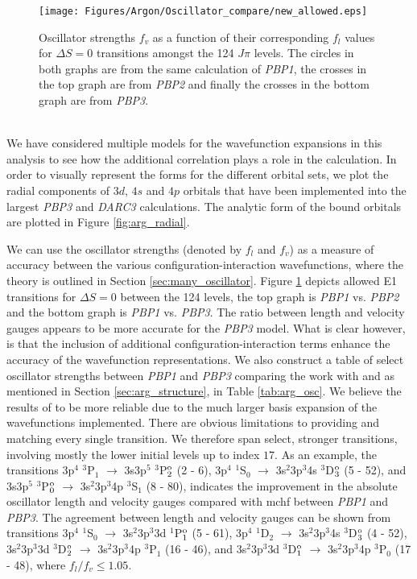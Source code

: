 %
%
\begin{figure}[h]
\texttt{[image: Figures/Argon/Oscillator\_compare/new\_allowed.eps]}
\caption{Oscillator strengths $f_v$ as a function of their corresponding $f_l$ values for $\Delta S = 0$ transitions amongst the 124 $J\pi$ levels. The circles in both graphs are from the same calculation of \textit{PBP1}, the crosses in the top graph are from \textit{PBP2} and finally the crosses in the bottom graph are from \textit{PBP3}. \label{fig:arg_osc}}
\end{figure}

\\
We have considered multiple models for the wavefunction expansions in this analysis to see how the additional correlation plays a role in the calculation. In order to visually represent the forms for the different orbital sets, we plot the radial components of $3d$, $4s$ and $4p$ orbitals that have been implemented into the largest \textit{PBP3} and \textit{DARC3} calculations. The analytic form of the bound orbitals are plotted in Figure \ref{fig:arg_radial}. 

We can use the oscillator strengths (denoted by $f_l$ and $f_v$) as a measure of accuracy between the various configuration-interaction wavefunctions, where the theory is outlined in Section \ref{sec:many_oscillator}. Figure \ref{fig:arg_osc} depicts allowed E1 transitions for $\Delta S = 0$ between the 124 levels,  the top graph is \textit{PBP1} vs. \textit{PBP2} and the bottom graph is \textit{PBP1} vs. \textit{PBP3}. The ratio between length and velocity gauges appears to be more accurate for the \textit{PBP3} model. What is clear however, is that the inclusion of additional configuration-interaction terms enhance the accuracy of the wavefunction representations. We also construct a table of select oscillator strengths between \textit{PBP1} and \textit{PBP3} comparing the work with \citet{2001JQSRT..69..171L} and \citet{2006ADNDT..92..607F} as mentioned in Section \ref{sec:arg_structure}, in Table \ref{tab:arg_osc}. We believe the results of \citet{2006ADNDT..92..607F} to be more reliable due to the much larger basis expansion of the wavefunctions implemented. There are obvious limitations to providing and matching every single transition. We therefore span select, stronger transitions, involving mostly the lower initial levels up to index $17$. As an example, the transitions 3p$^4$ $^3$P$_1$ $\rightarrow$ 3s3p$^5$ $^3$P$^{\rm o}_2$ (2 - 6), 3p$^4$ $^1$S$_0$ $\rightarrow$ 3s$^2$3p$^3$4s $^3$D$^{\rm o}_3$ (5 - 52), and 3s3p$^5$ $^3$P$^{\rm o}_0$ $\rightarrow$ 3s$^2$3p$^3$4p $^3$S$_1$ (8 - 80), indicates the improvement in the absolute oscillator length and velocity gauges compared with {\sc mchf} between \textit{PBP1} and \textit{PBP3}. The agreement between length and velocity gauges can be shown from transitions 3p$^4$ $^1$S$_0$ $\rightarrow$ 3s$^2$3p$^3$3d $^1$P$^{\rm o}_1$ (5 - 61), 3p$^4$ $^1$D$_2$ $\rightarrow$ 3s$^2$3p$^3$4s $^3$D$^{\rm o}_3$ (4 - 52), 3s$^2$3p$^3$3d $^3$D$^{\rm o}_2$ $\rightarrow$ 3s$^2$3p$^3$4p $^3$P$_1$ (16 - 46), and 3s$^2$3p$^3$3d $^3$D$^{\rm o}_1$ $\rightarrow$ 3s$^2$3p$^3$4p $^3$P$_0$ (17 - 48), where $f_l/f_v \leq 1.05$. 

